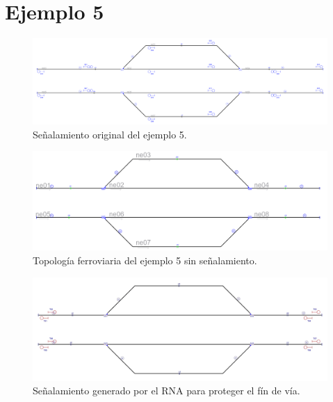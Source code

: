 \section{Ejemplo 5}

    \lipsum[1]

    \begin{figure}[h]
        \centering
        \includegraphics[width=1\textwidth]{resultados-obtenidos/ejemplo5/images/5_original.png}
        \centering\caption{Señalamiento original del ejemplo 5.}
    \end{figure}

    \begin{figure}[h]
        \centering
        \includegraphics[width=1\textwidth]{resultados-obtenidos/ejemplo5/images/5_empty.png}
        \centering\caption{Topología ferroviaria del ejemplo 5 sin señalamiento.}
    \end{figure}

    \begin{figure}[h]
        \centering
        \includegraphics[width=1\textwidth]{resultados-obtenidos/ejemplo5/images/5_step1.png}
        \centering\caption{Señalamiento generado por el RNA para proteger el fín de vía.}
    \end{figure}

